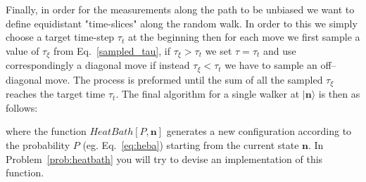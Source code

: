 Finally, in order for the measurements along the path to be unbiased we want to define equidistant "time-slices" along the random walk. In 
order to this we simply choose a target time-step $\tau_t$ at the beginning then for each move we first sample a value of $\tau_{\xi}$ 
from Eq.~\eqref{sampled_tau}, if $\tau_{\xi} > \tau_t$ we set $\tau=\tau_t$ and use correspondingly a diagonal move if instead $\tau_{\xi} < \tau_t$ 
we have to sample an off--diagonal move. The process is preformed until the sum of all the sampled $\tau_{\xi}$ reaches the target time $\tau_t$. 
The final algorithm for a single walker at $\rvert \mathbf{n}\rangle$ is then as follows: 
\begin{svgraybox}
\begin{algorithmic} 
\Loop
  \If{$\tau_\xi\geq\tau$}
  \EndIf
  \State{$\tau\to\tau-\tau_\xi$}
\EndLoop
\end{algorithmic}
\end{svgraybox}
where the function $HeatBath[P,\mathbf{n}]$ generates a new configuration according to the probability $P$ (eg. Eq.~\eqref{eq:heba}) starting 
from the current state $\mathbf{n}$. In Problem~\ref{prob:heatbath} you will try to devise an implementation of this function.

